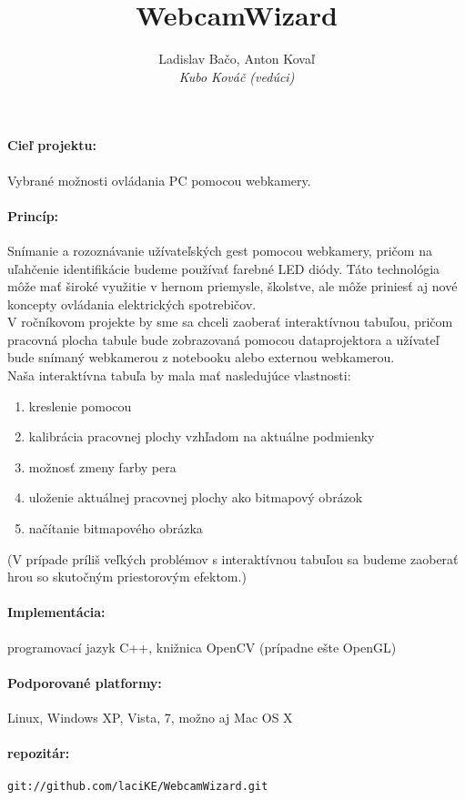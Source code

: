 \documentclass[12pt,a4paper]{article}
\begin{document}
\title{WebcamWizard}
\author{Ladislav Bačo, Anton Kovaľ \\ {\it Kubo Kováč (vedúci)}}
\maketitle

\paragraph{Cieľ projektu:} Vybrané možnosti ovládania PC pomocou webkamery.

\paragraph{Princíp:} Snímanie a rozoznávanie užívateľských gest pomocou webkamery, pričom na uľahčenie identifikácie budeme používať farebné LED diódy. Táto technológia môže mať široké využitie v hernom priemysle, školstve, ale môže priniesť aj nové koncepty ovládania elektrických spotrebičov.\\
V ročníkovom projekte by sme sa chceli zaoberať interaktívnou tabuľou, pričom pracovná plocha tabule bude zobrazovaná pomocou dataprojektora a užívateľ bude snímaný webkamerou z notebooku alebo externou webkamerou.\\
Naša interaktívna tabuľa by mala mať nasledujúce vlastnosti:
\begin{enumerate}
\item kreslenie pomocou 
\item kalibrácia pracovnej plochy vzhľadom na aktuálne podmienky
\item možnosť zmeny farby pera
\item uloženie aktuálnej pracovnej plochy ako bitmapový obrázok
\item načítanie bitmapového obrázka
\end{enumerate}

(V prípade príliš veľkých problémov s interaktívnou tabuľou sa budeme zaoberať hrou so skutočným priestorovým efektom.)

\paragraph{Implementácia:} programovací jazyk C++, knižnica OpenCV (prípadne ešte OpenGL)
\paragraph{Podporované platformy:} Linux, Windows XP, Vista, 7, možno aj Mac OS X
\paragraph{repozitár:} {\tt git://github.com/laciKE/WebcamWizard.git}
\end{document}

